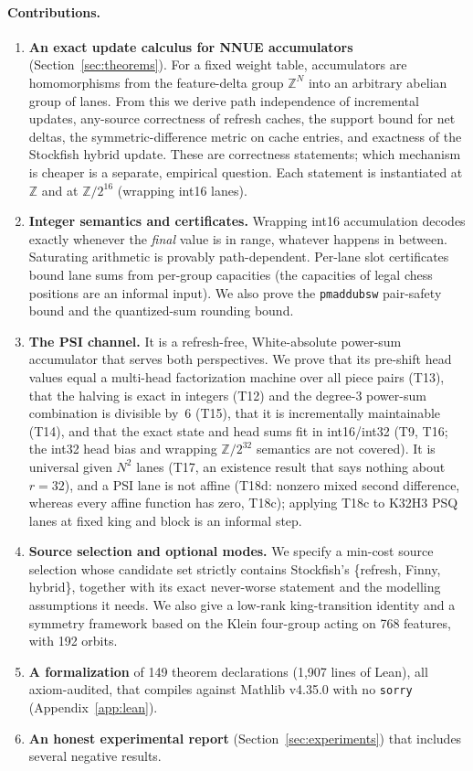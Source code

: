 \documentclass[10pt]{article}
\newcommand{\Z}{\mathbb{Z}}
\newcommand{\Zm}[1]{\Z/2^{#1}}
\theoremstyle{plain}
\theoremstyle{definition}
\begin{document}
\paragraph{Contributions.}
\begin{enumerate}[leftmargin=*,itemsep=2pt]
\item \textbf{An exact update calculus for NNUE accumulators} (Section~\ref{sec:theorems}).
For a fixed weight table, accumulators are homomorphisms from the feature-delta group $\Z^N$ into an arbitrary abelian group of lanes.
From this we derive path independence of incremental updates, any-source correctness of refresh caches, the support bound for net deltas, the symmetric-difference metric on cache entries, and exactness of the Stockfish hybrid update.
These are correctness statements; which mechanism is cheaper is a separate, empirical question.
Each statement is instantiated at $\Z$ and at $\Zm{16}$ (wrapping int16 lanes).
\item \textbf{Integer semantics and certificates.}
Wrapping int16 accumulation decodes exactly whenever the \emph{final} value is in range, whatever happens in between.
Saturating arithmetic is provably path-dependent.
Per-lane slot certificates bound lane sums from per-group capacities (the capacities of legal chess positions are an informal input).
We also prove the \texttt{pmaddubsw} pair-safety bound and the quantized-sum rounding bound.
\item \textbf{The PSI channel.}
It is a refresh-free, White-absolute power-sum accumulator that serves both perspectives.
We prove that its pre-shift head values equal a multi-head factorization machine over all piece pairs (T13), that the halving is exact in integers (T12) and the degree-3 power-sum combination is divisible by~6 (T15), that it is incrementally maintainable (T14), and that the exact state and head sums fit in int16/int32 (T9, T16; the int32 head bias and wrapping $\Zm{32}$ semantics are not covered).
It is universal given $N^2$ lanes (T17, an existence result that says nothing about $r=32$), and a PSI lane is not affine (T18d: nonzero mixed second difference, whereas every affine function has zero, T18c); applying T18c to K32H3 PSQ lanes at fixed king and block is an informal step.
\item \textbf{Source selection and optional modes.}
We specify a min-cost source selection whose candidate set strictly contains Stockfish's \{refresh, Finny, hybrid\}, together with its exact never-worse statement and the modelling assumptions it needs.
We also give a low-rank king-transition identity and a symmetry framework based on the Klein four-group acting on 768 features, with 192 orbits.
\item \textbf{A formalization} of 149 theorem declarations (1,907 lines of Lean), all axiom-audited, that compiles against Mathlib v4.35.0 with no \texttt{sorry} (Appendix~\ref{app:lean}).
\item \textbf{An honest experimental report} (Section~\ref{sec:experiments}) that includes several negative results.
\end{enumerate}
\end{document}
